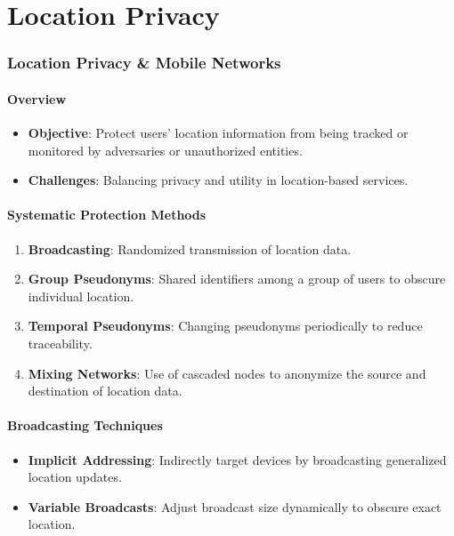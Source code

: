 \documentclass{article}
\begin{document}

\part{Location Privacy}
\section{Location Privacy \& Mobile Networks}

\subsection{Overview}
\begin{itemize}
  \item \textbf{Objective}: Protect users' location information from being tracked or monitored by adversaries or unauthorized entities.
  \item \textbf{Challenges}: Balancing privacy and utility in location-based services.
\end{itemize}

\subsection{Systematic Protection Methods}
\begin{enumerate}
  \item \textbf{Broadcasting}: Randomized transmission of location data.
  \item \textbf{Group Pseudonyms}: Shared identifiers among a group of users to obscure individual location.
  \item \textbf{Temporal Pseudonyms}: Changing pseudonyms periodically to reduce traceability.
  \item \textbf{Mixing Networks}: Use of cascaded nodes to anonymize the source and destination of location data.
\end{enumerate}

\subsection{Broadcasting Techniques}
\begin{itemize}
  \item \textbf{Implicit Addressing}: Indirectly target devices by broadcasting generalized location updates.
  \item \textbf{Variable Broadcasts}: Adjust broadcast size dynamically to obscure exact location.
\end{itemize}
\end{document}

